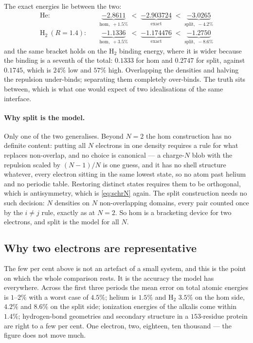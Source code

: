 \documentclass[11pt]{article}
\begin{document}
The exact energies lie between the two:
\begin{align*}
\text{He:}\quad & \underbrace{-2.8611}_{\text{hom},\;+1.5\%} \;<\;
                  \underbrace{-2.903724}_{\text{exact}} \;<\;
                  \underbrace{-3.0265}_{\text{split},\;-4.2\%} \\[2pt]
\text{H}_2\ (R=1.4):\quad & \underbrace{-1.1336}_{\text{hom},\;+3.5\%} \;<\;
                  \underbrace{-1.174476}_{\text{exact}} \;<\;
                  \underbrace{-1.2750}_{\text{split},\;-8.6\%}
\end{align*}
and the same bracket holds on the H$_2$ binding energy, where it is wider because the binding is a
seventh of the total: $0.1333$ for hom and $0.2747$ for split, against $0.1745$, which is $24\%$
low and $57\%$ high. Overlapping the densities and halving the repulsion under-binds; separating
them completely over-binds. The truth sits between, which is what one would expect of two
idealisations of the same interface.

\paragraph{Why split is the model.} Only one of the two generalises. Beyond $N=2$ the hom
construction has no definite content: putting all $N$ electrons in one density requires a rule for
what replaces non-overlap, and no choice is canonical --- a charge-$N$ blob with the repulsion
scaled by $(N-1)/N$ is one guess, and it has no shell structure whatever, every electron sitting in
the same lowest state, so no atom past helium and no periodic table. Restoring distinct states
requires them to be orthogonal, which is antisymmetry, which is \eqref{eq:schrN} again. The split
construction needs no such decision: $N$ densities on $N$ non-overlapping domains, every pair
counted once by the $i\neq j$ rule, exactly as at $N=2$. So hom is a bracketing device for two
electrons, and split is the model for all $N$.

\subsection*{Why two electrons are representative}

The few per cent above is not an artefact of a small system, and this is the point on which the
whole comparison rests. It is the accuracy the model has everywhere. Across the first three periods
the mean error on total atomic energies is $1$--$2\%$ with a worst case of $4.5\%$; helium is
$1.5\%$ and H$_2$ $3.5\%$ on the hom side, $4.2\%$ and $8.6\%$ on the split side; ionization
energies of the alkalis come within $1.4\%$; hydrogen-bond geometries and secondary structure in a
$153$-residue protein are right to a few per cent. One electron, two, eighteen, ten thousand ---
the figure does not move much.
\end{document}
